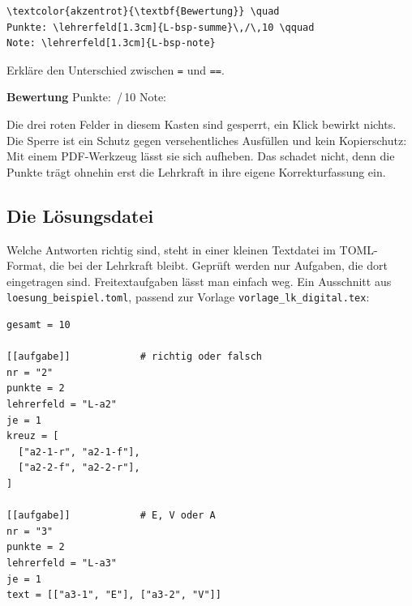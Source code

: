 \begin{Form}
\begin{lstlisting}[style=latex]
\textcolor{akzentrot}{\textbf{Bewertung}} \quad
Punkte: \lehrerfeld[1.3cm]{L-bsp-summe}\,/\,10 \qquad
Note: \lehrerfeld[1.3cm]{L-bsp-note}
\end{lstlisting}

\begin{ausgabe}
Erkläre den Unterschied zwischen \texttt{=} und \texttt{==}.

\textcolor{akzentrot}{\textbf{Bewertung}} \quad
Punkte: \,/\,10 \qquad
Note: 
\end{ausgabe}

Die drei roten Felder in diesem Kasten sind gesperrt, ein Klick bewirkt
nichts. Die Sperre ist ein Schutz gegen versehentliches Ausfüllen und kein
Kopierschutz: Mit einem PDF-Werkzeug lässt sie sich aufheben. Das schadet
nicht, denn die Punkte trägt ohnehin erst die Lehrkraft in ihre eigene
Korrekturfassung ein.

\subsection{Die Lösungsdatei}

Welche Antworten richtig sind, steht in einer kleinen Textdatei im
TOML-Format, die bei der Lehrkraft bleibt. Geprüft werden nur Aufgaben, die
dort eingetragen sind. Freitextaufgaben lässt man einfach weg. Ein Ausschnitt
aus \texttt{loesung\_beispiel.toml}, passend zur Vorlage
\texttt{vorlage\_lk\_digital.tex}:

\begin{lstlisting}[style=latex, language={}]
gesamt = 10

[[aufgabe]]            # richtig oder falsch
nr = "2"
punkte = 2
lehrerfeld = "L-a2"
je = 1
kreuz = [
  ["a2-1-r", "a2-1-f"],
  ["a2-2-f", "a2-2-r"],
]

[[aufgabe]]            # E, V oder A
nr = "3"
punkte = 2
lehrerfeld = "L-a3"
je = 1
text = [["a3-1", "E"], ["a3-2", "V"]]
\end{lstlisting}


\end{Form}
